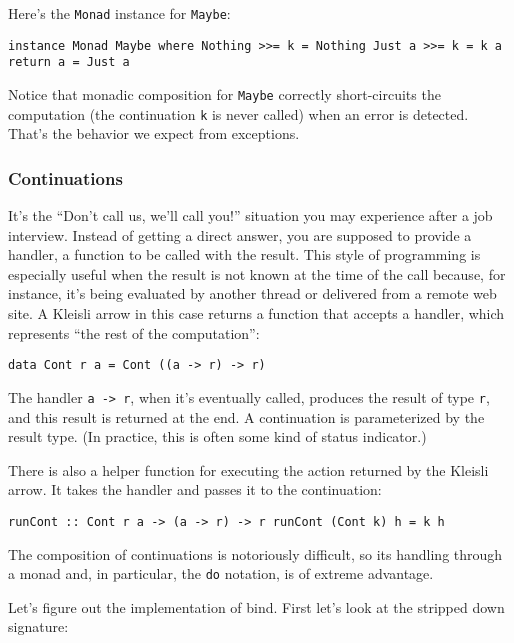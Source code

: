 Here's the \texttt{Monad} instance for \texttt{Maybe}:

\begin{verbatim}
instance Monad Maybe where Nothing >>= k = Nothing Just a >>= k = k a return a = Just a
\end{verbatim}

Notice that monadic composition for \texttt{Maybe} correctly
short-circuits the computation (the continuation \texttt{k} is never
called) when an error is detected. That's the behavior we expect from
exceptions.

\subsubsection{Continuations}\label{continuations}

It's the ``Don't call us, we'll call you!'' situation you may experience
after a job interview. Instead of getting a direct answer, you are
supposed to provide a handler, a function to be called with the result.
This style of programming is especially useful when the result is not
known at the time of the call because, for instance, it's being
evaluated by another thread or delivered from a remote web site. A
Kleisli arrow in this case returns a function that accepts a handler,
which represents ``the rest of the computation'':

\begin{verbatim}
data Cont r a = Cont ((a -> r) -> r)
\end{verbatim}

The handler \texttt{a\ -\textgreater{}\ r}, when it's eventually called,
produces the result of type \texttt{r}, and this result is returned at
the end. A continuation is parameterized by the result type. (In
practice, this is often some kind of status indicator.)

There is also a helper function for executing the action returned by the
Kleisli arrow. It takes the handler and passes it to the continuation:

\begin{verbatim}
runCont :: Cont r a -> (a -> r) -> r runCont (Cont k) h = k h
\end{verbatim}

The composition of continuations is notoriously difficult, so its
handling through a monad and, in particular, the \texttt{do} notation,
is of extreme advantage.

Let's figure out the implementation of bind. First let's look at the
stripped down signature:

